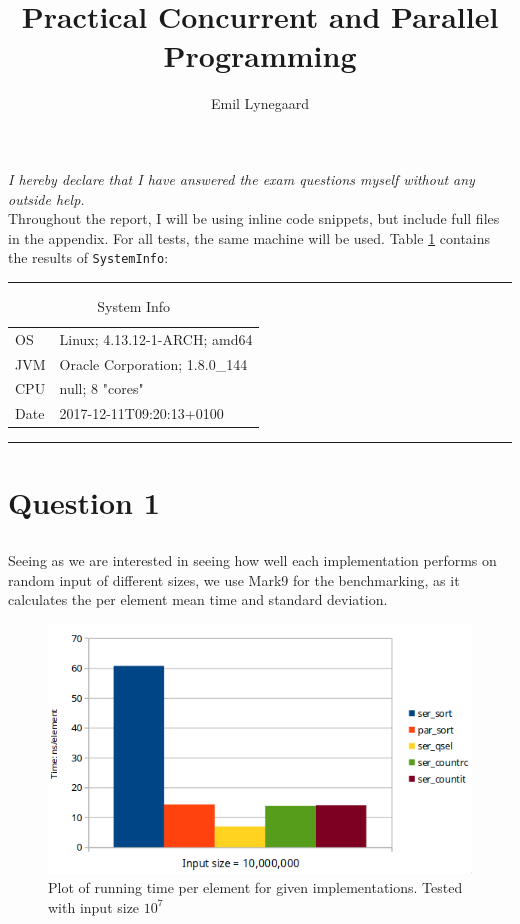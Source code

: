 \documentclass[a5paper]{article}
\title{Practical Concurrent and Parallel Programming}
\author{Emil Lynegaard}
\begin{document}


\newpage
\tableofcontents
\newpage

\maketitle
\textit{I hereby declare that I have answered the exam questions myself without any outside help.}\\

Throughout the report, I will be using inline code snippets, but include full files in the appendix. For all tests, the same machine will be used. Table \ref{table:sysinfo} contains the results of \texttt{SystemInfo}:

\par\noindent\rule{\textwidth}{0.4pt}
\begin{table}[!ht]
\begin{center}
\begin{tabular}{ l l }
OS & Linux; 4.13.12-1-ARCH; amd64\\
JVM & Oracle Corporation; 1.8.0\_144\\
CPU & null; 8 "cores"\\
Date & 2017-12-11T09:20:13+0100
\end{tabular}
\end{center}
\caption{System Info}
\label{table:sysinfo}
\end{table}
\par\noindent\rule{\textwidth}{0.4pt}
\newpage

\section{Question 1}
\subsection{}
Seeing as we are interested in seeing how well each implementation performs on random input of different sizes, we use Mark9 for the benchmarking, as it calculates the per element mean time and standard deviation.

\begin{figure}[!ht]
    \centering
    \noindent\includegraphics[scale=0.5]{res/graph_q1.png}
    \caption{Plot of running time per element for given implementations. Tested with input size $10^7$}
    \label{fig:graphq1}
\end{figure}
\end{document}
